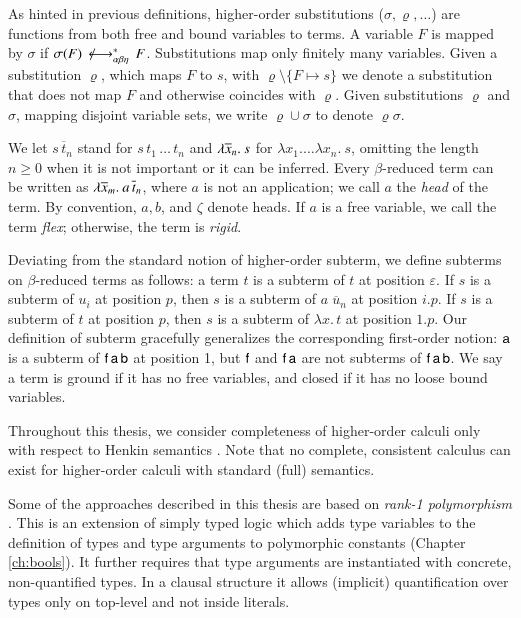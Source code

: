 As hinted in previous definitions, higher-order substitutions
($\sigma,\varrho,\ldots$) are functions from both free and bound variables to
terms. A variable $F$ is mapped by $\sigma$ if $ \sigma(F)\,\not\longleftrightarrow^*_{\alpha\beta\eta}\,F$.
Substitutions map only finitely many variables. Given a substitution $\varrho$,
which maps $F$ to $s$, with $\varrho\setminus\{F \mapsto s\}$ we denote a
substitution that does not map $F$ and otherwise coincides with $\varrho$. Given
substitutions $\varrho$ and $\sigma$, mapping disjoint variable sets, we write
$\varrho \cup \sigma$ to denote $\varrho\sigma$.

We let $s \, \overline{t}_n$ stand for $s \, t_1 \, \ldots \, t_n$
and $\lambda \overline{x}_n.\> s$ for $\lambda x_1. \ldots \lambda x_n. \> s$,
omitting the length $n \geq 0$ when it is not important or it can be inferred. Every
$\beta$-reduced term can be written as $\lambda \overline{x}_{m}.\> a \, \overline{t}_{n}$,
where $a$ is not an application; we call $a$ the \emph{head} of the term. By
convention, $a, b$, and $\zeta$ denote heads. If $a$ is a free variable, we call the term
\emph{flex}; otherwise, the term is \emph{rigid}.

Deviating from the standard notion of higher-order subterm, we define subterms
on $\beta$-reduced terms as follows: a term $t$ is a subterm of $t$ at position
$\varepsilon$. If $s$ is a subterm of $u_i$ at position $p$, then $s$ is a
subterm of $a\;\overline{u}_n$ at position $i.p$. If $s$ is a subterm of $t$ at
position $p$, then $s$ is a subterm of $\lambda x.\, t$ at position $1.p$. Our
definition of subterm gracefully generalizes the corresponding first-order
notion: $\mathsf{a}$ is a subterm of $\mathsf{f} \, \mathsf{a} \, \mathsf{b}$ at position 1,
but $\mathsf{f}$ and $\mathsf{f} \, \mathsf{a}$ are not subterms of $\mathsf{f} \, \mathsf{a}
\, \mathsf{b}$. We say a term is ground if it has no free variables, and closed
if it has no loose bound variables.


Throughout this thesis, we consider completeness of higher-order calculi only
with respect to Henkin semantics \cite{bm-14-automation-ho}. Note that no
complete, consistent calculus can exist for higher-order calculi with standard (full)
semantics.

Some of the approaches described in this thesis are based on {\em rank-1
polymorphism} \cite{bp-13-tff1,ksr-16-th1}. This is an extension of simply typed
logic which adds type variables to the definition of types and type arguments to
polymorphic constants (Chapter \ref{ch:bools}). It further
requires that type arguments are instantiated with concrete, non-quantified
types. In a clausal structure it allows (implicit)
quantification over types only on top-level and not inside literals.

